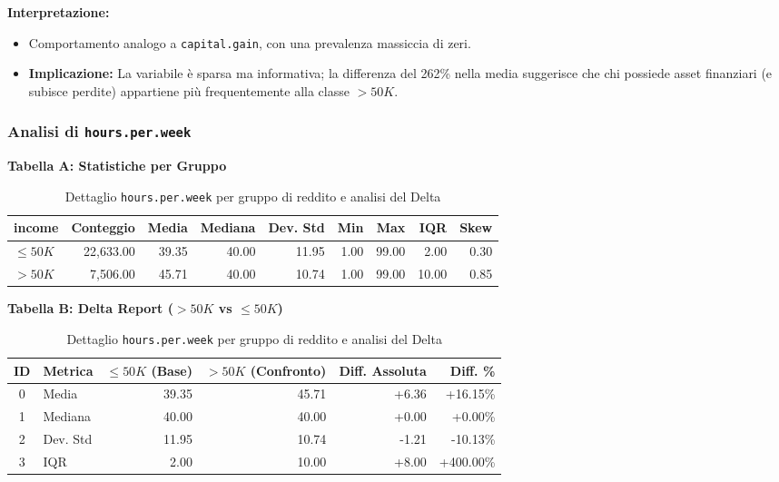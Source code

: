 \noindent
\textbf{Interpretazione:}
\begin{itemize}
    \item Comportamento analogo a \texttt{capital.gain}, con una prevalenza massiccia di zeri.
    \item \textbf{Implicazione:} La variabile è sparsa ma informativa; la differenza del 262\% nella media suggerisce che chi possiede asset finanziari (e subisce perdite) appartiene più frequentemente alla classe $>50K$.
\end{itemize}

\newpage
\subsubsection{Analisi di \texttt{hours.per.week}}

\begin{table}[H]
    \centering
    \footnotesize
    \caption{Dettaglio \texttt{hours.per.week} per gruppo di reddito e analisi del Delta}
    
    \textbf{Tabella A: Statistiche per Gruppo} \\
    \begin{tabular}{lrrrrrrrr}
        \toprule
        \textbf{income} & \textbf{Conteggio} & \textbf{Media} & \textbf{Mediana} & \textbf{Dev. Std} & \textbf{Min} & \textbf{Max} & \textbf{IQR} & \textbf{Skew} \\
        \midrule
        $\leq 50K$ & 22,633.00 & 39.35 & 40.00 & 11.95 & 1.00 & 99.00 & 2.00 & 0.30 \\
        $> 50K$ & 7,506.00 & 45.71 & 40.00 & 10.74 & 1.00 & 99.00 & 10.00 & 0.85 \\
        \bottomrule
    \end{tabular}

    \vspace{0.4cm}
    
    \textbf{Tabella B: Delta Report ($>50K$ vs $\leq 50K$)} \\
    \begin{tabular}{clrrrr}
        \toprule
        \textbf{ID} & \textbf{Metrica} & \textbf{$\leq 50K$ (Base)} & \textbf{$> 50K$ (Confronto)} & \textbf{Diff. Assoluta} & \textbf{Diff. \%} \\
        \midrule
        0 & Media & 39.35 & 45.71 & +6.36 & +16.15\% \\
        1 & Mediana & 40.00 & 40.00 & +0.00 & +0.00\% \\
        2 & Dev. Std & 11.95 & 10.74 & -1.21 & -10.13\% \\
        3 & IQR & 2.00 & 10.00 & +8.00 & +400.00\% \\
        \bottomrule
    \end{tabular}
\end{table}

